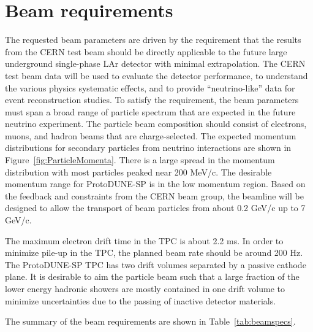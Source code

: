 \section{Beam requirements}
\label{sec:beamrequirements}

The requested beam parameters are driven by the requirement that the results from the CERN test beam should be directly applicable to the future large underground single-phase LAr detector with minimal extrapolation. The CERN test beam data will be used to evaluate the detector performance, to understand the various physics systematic effects, and to provide ``neutrino-like'' data for event reconstruction studies. To satisfy the requirement, the beam parameters must span a broad range of particle spectrum that are expected in the future neutrino experiment. The particle beam composition should consist of electrons, muons, and hadron beams that are charge-selected. The expected momentum distributions for secondary particles from neutrino interactions are shown in Figure~\ref{fig:ParticleMomenta}. There is a large spread in the momentum distribution with most particles peaked near 200 MeV/c.  The desirable momentum range for ProtoDUNE-SP  is in the low momentum region. Based on the feedback and constraints from the CERN beam group, the beamline will be designed to allow the transport of beam particles from about 0.2 GeV/c up to 7 GeV/c. 

The maximum electron drift time in the TPC is about 2.2 ms. In order to minimize pile-up in the TPC, the planned beam rate should be around 200 Hz.  The ProtoDUNE-SP TPC has two drift volumes separated by a passive cathode plane.
It is desirable to aim the particle beam such that a large fraction of the lower energy hadronic showers are mostly contained in one drift 
volume to minimize uncertainties due to the passing of inactive detector materials.

The summary of the beam requirements are shown in Table~\ref{tab:beamspecs}.

